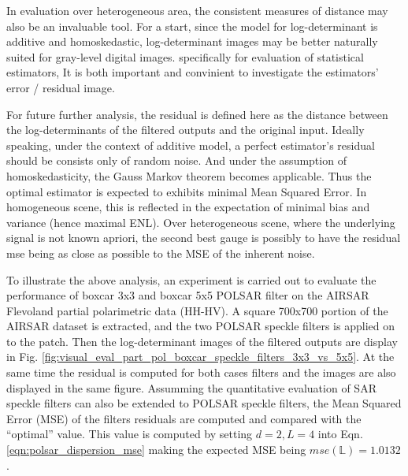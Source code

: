 \documentclass[journal]{IEEEtran}
\begin{document}
In evaluation over heterogeneous area, the consistent measures of distance may also be an invaluable tool.
For a start, since the model for log-determinant is additive and homoskedastic,
  log-determinant images may be better naturally suited for gray-level digital images.
specifically for evaluation of statistical estimators,
  It is both important and convinient to investigate the estimators' error / residual image. %

For future further analysis, the residual is defined here as the distance between the log-determinants of the filtered outputs and the original input. 
Ideally speaking, under the context of additive model,
  a perfect estimator's residual should be consists only of random noise.
And under the assumption of homoskedasticity, 
  the Gauss Markov theorem becomes applicable.
Thus the optimal estimator is expected to exhibits minimal Mean Squared Error.
In homogeneous scene, this is reflected in the expectation of minimal bias and variance (hence maximal ENL).
Over heterogeneous scene, where the underlying signal is not known apriori,
  the second best gauge is possibly to have the residual mse being as close as possible to the MSE of the inherent noise.
  
To illustrate the above analysis, an experiment is carried out to evaluate the performance of boxcar 3x3 and boxcar 5x5 POLSAR filter on the AIRSAR Flevoland partial polarimetric data (HH-HV).
A square 700x700 portion of the AIRSAR dataset is extracted, and the two POLSAR speckle filters is applied on to the patch.
Then the log-determinant images of the filtered outputs are display in Fig. \ref{fig:visual_eval_part_pol_boxcar_speckle_filters_3x3_vs_5x5}.
At the same time the residual is computed for both cases filters and the images are also displayed in the same figure.
Assumming the quantitative evaluation of SAR speckle filters can also be extended to POLSAR speckle filters,
  the Mean Squared Error (MSE) of the filters residuals are computed and compared with the ``optimal'' value.
This value is computed   
by setting $d=2,L=4$ into Eqn. \ref{eqn:polsar_dispersion_mse} making the expected MSE being $mse(\mathbb{L})=1.0132$.
\end{document}
